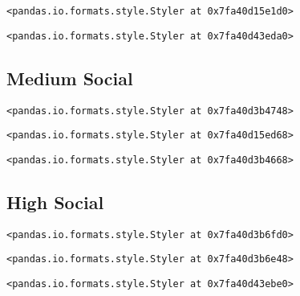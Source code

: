 \documentclass[11pt]{article}
\begin{document}
    
    
    \begin{verbatim}
<pandas.io.formats.style.Styler at 0x7fa40d15e1d0>
    \end{verbatim}

    
    
    \begin{verbatim}
<pandas.io.formats.style.Styler at 0x7fa40d43eda0>
    \end{verbatim}

    
    \hypertarget{medium-social}{%
\subsection{\texorpdfstring{\textbf{Medium
Social}}{Medium Social}}\label{medium-social}}

    
    
    \begin{verbatim}
<pandas.io.formats.style.Styler at 0x7fa40d3b4748>
    \end{verbatim}

    
    
    \begin{verbatim}
<pandas.io.formats.style.Styler at 0x7fa40d15ed68>
    \end{verbatim}

    
    
    \begin{verbatim}
<pandas.io.formats.style.Styler at 0x7fa40d3b4668>
    \end{verbatim}

    
    \hypertarget{high-social}{%
\subsection{\texorpdfstring{\textbf{High
Social}}{High Social}}\label{high-social}}

    
    
    \begin{verbatim}
<pandas.io.formats.style.Styler at 0x7fa40d3b6fd0>
    \end{verbatim}

    
    
    \begin{verbatim}
<pandas.io.formats.style.Styler at 0x7fa40d3b6e48>
    \end{verbatim}

    
    
    \begin{verbatim}
<pandas.io.formats.style.Styler at 0x7fa40d43ebe0>
    \end{verbatim}
\end{document}
